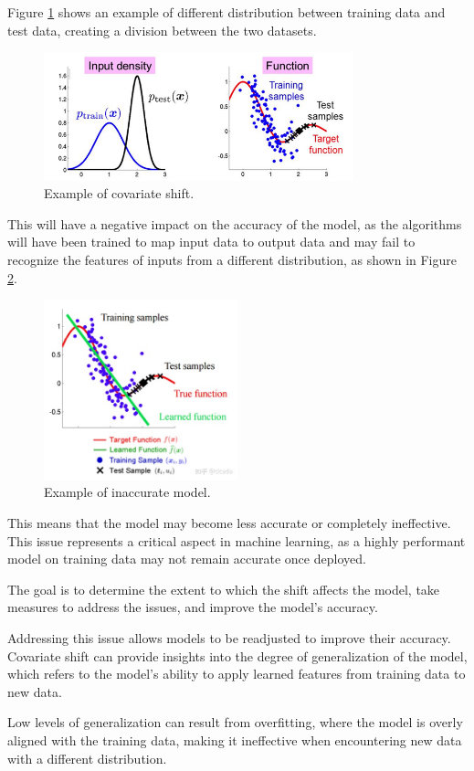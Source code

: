 Figure \ref{fig:covariate-shift} shows an example of different distribution between training data and test data, creating a division between the two datasets.  
	

	\begin{figure}[H]
		\centering
		\includegraphics[width=0.8\textwidth]{assets/immagine.png} 
		\caption{Example of covariate shift.}
		\label{fig:covariate-shift}
	\end{figure}

	
This will have a negative impact on the accuracy of the model, as the algorithms will have been trained to map input data to output data and may fail to recognize the features of inputs from a different distribution, as shown in Figure \ref{fig:inaccurate-model}.  
	

	\begin{figure}[H]
		\centering
		\includegraphics[width=0.5\textwidth]{assets/covariate_shift.png} 
		\caption{Example of inaccurate model.}
		\label{fig:inaccurate-model}
	\end{figure}  

\vspace{0.5cm}

This means that the model may become less accurate or completely ineffective. This issue represents a critical aspect in machine learning, as a highly performant model on training data may not remain accurate once deployed.

The goal is to determine the extent to which the shift affects the model, take measures to address the issues, and improve the model's accuracy.
	
Addressing this issue allows models to be readjusted to improve their accuracy. Covariate shift can provide insights into the degree of generalization of the model, which refers to the model's ability to apply learned features from training data to new data.

Low levels of generalization can result from overfitting, where the model is overly aligned with the training data, making it ineffective when encountering new data with a different distribution.  
